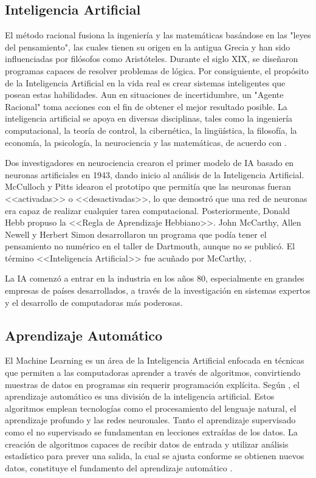 \subsection{Inteligencia Artificial}

El método racional fusiona la ingeniería y las matemáticas basándose en las "leyes del pensamiento", las cuales tienen su origen en la antigua Grecia y han sido influenciadas por filósofos como Aristóteles. Durante el siglo XIX, se diseñaron programas capaces de resolver problemas de lógica. Por consiguiente, el propósito de la Inteligencia Artificial en la vida real es crear sistemas inteligentes que posean estas habilidades. Aun en situaciones de incertidumbre, un "Agente Racional" toma acciones con el fin de obtener el mejor resultado posible. La inteligencia artificial se apoya en diversas disciplinas, tales como la ingeniería computacional, la teoría de control, la cibernética, la lingüística, la filosofía, la economía, la psicología, la neurociencia y las matemáticas, de acuerdo con \cite{bk_russell2004intart}.

Dos investigadores en neurociencia crearon el primer modelo de IA basado en neuronas artificiales en 1943, dando inicio al análisis de la Inteligencia Artificial. McCulloch y Pitts idearon el prototipo que permitía que las neuronas fueran <<activadas>> o <<desactivadas>>, lo que demostró que una red de neuronas era capaz de realizar cualquier tarea computacional. Posteriormente, Donald Hebb propuso la <<Regla de Aprendizaje Hebbiano>>. John McCarthy, Allen Newell y Herbert Simon desarrollaron un programa que podía tener el pensamiento no numérico en el taller de Dartmouth, aunque no se publicó. El término <<Inteligencia Artificial>> fue acuñado por McCarthy, \parencite{bk_russell2004intart}.

La IA comenzó a entrar en la industria en los años 80, especialmente en grandes empresas de países desarrollados, a través de la investigación en sistemas expertos y el desarrollo de computadoras más poderosas.

\subsection{Aprendizaje Automático}
El Machine Learning es un área de la Inteligencia Artificial enfocada en técnicas que permiten a las computadoras aprender a través de algoritmos, convirtiendo muestras de datos en programas sin requerir programación explícita. Según \cite{bk_russell2009intart}, el aprendizaje automático es una división de la inteligencia artificial. Estos algoritmos emplean tecnologías como el procesamiento del lenguaje natural, el aprendizaje profundo y las redes neuronales. Tanto el aprendizaje supervisado como el no supervisado se fundamentan en lecciones extraídas de los datos. La creación de algoritmos capaces de recibir datos de entrada y utilizar análisis estadístico para prever una salida, la cual se ajusta conforme se obtienen nuevos datos, constituye el fundamento del aprendizaje automático \cite{bk_alpaydin2014ml}.

